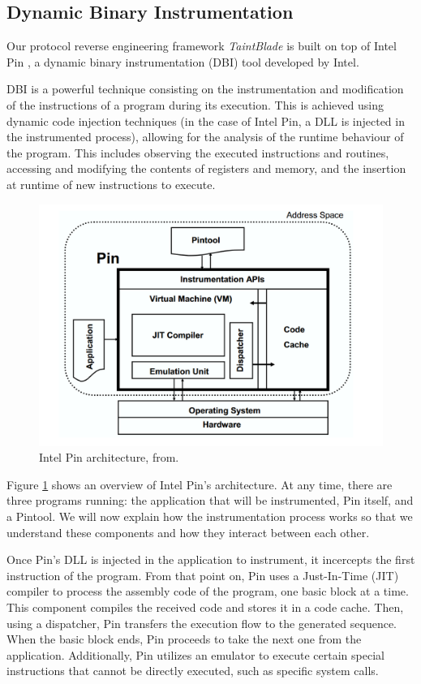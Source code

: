 \documentclass[conference]{IEEEtran}
\begin{document}
\subsection {Dynamic Binary Instrumentation}
Our protocol reverse engineering framework \textit{TaintBlade} is built on top
of Intel Pin \cite{intelpin_main}, a dynamic binary instrumentation (DBI) tool
developed by Intel.

DBI is a powerful technique consisting on the instrumentation and modification
of the instructions of a program during its execution. This is achieved using
dynamic code injection techniques (in the case of Intel Pin, a DLL is injected
in the instrumented process), allowing for the analysis of the runtime
behaviour of the program. This includes observing the executed instructions and
routines, accessing and modifying the contents of registers and memory, and the
insertion at runtime of new instructions to execute.

\begin{figure}[htbp]
    \centerline{\includegraphics[width=1.0\columnwidth]{images/intelpin_arch.png}}
    \caption{Intel Pin architecture, from\cite{intelpin_lukpaper}.}
    \label{figure:intelpin_arch}
\end{figure}

Figure \ref{figure:intelpin_arch} shows an overview of Intel Pin's
architecture. At any time, there are three programs running: the application
that will be instrumented, Pin itself, and a Pintool. We will now explain how
the instrumentation process works so that we understand these components and
how they interact between each other.

Once Pin's DLL is injected in the application to instrument, it incercepts the
first instruction of the program. From that point on, Pin uses a Just-In-Time
(JIT) compiler to process the assembly code of the program, one basic block at
a time. This component compiles the received code and stores it in a code
cache. Then, using a dispatcher, Pin transfers the execution flow to the
generated sequence. When the basic block ends, Pin proceeds to take the next
one from the application. Additionally, Pin utilizes an emulator to execute
certain special instructions that cannot be directly executed, such as specific
system calls.
\end{document}
